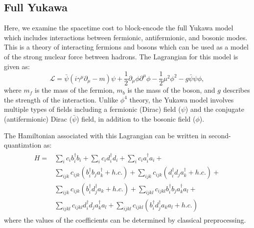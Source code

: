 \subsection{Full Yukawa}
\label{sec:yukawa_results}

Here, we examine the spacetime cost to block-encode the full Yukawa model which includes interactions between fermionic, antifermionic, and bosonic modes.  
This is a theory of interacting fermions and bosons which can be used as a model of the strong nuclear force between hadrons.
The Lagrangian for this model is given as:
\begin{equation}
    \label{eq:yukawa-lagrangian}
    \mathcal{L} = \bar \psi \left(i\gamma^\mu \partial_\mu - m \right)\psi + \frac{1}{2}\partial_\mu \phi \partial^\mu \phi - \frac{1}{2}\mu^2\phi^2 - g\bar \psi \psi \phi,
\end{equation}
where $m_f$ is the mass of the fermion, $m_b$ is the mass of the boson, and $g$ describes the strength of the interaction.
Unlike $\phi^4$ theory, the Yukawa model involves multiple types of fields including a fermionic (Dirac) field ($\psi$) and the conjugate (antifermionic) Dirac ($\bar \psi$) field, in addition to the bosonic field ($\phi$).

The Hamiltonian associated with this Lagrangian can be written in second-quantization as:
\begin{align}
    \begin{split}
        H = &\sum_i c_i b_i^\dagger b_i + \sum_i c_i d_i^\dagger d_i + \sum_i c_i a_i^\dagger a_i + \\
        &\sum_{ijk}c_{ijk}\left(b_i^\dagger b_j a_k^\dagger + h.c. \right) + \sum_{ijk}c_{ijk}\left(d_i^\dagger d_j a_k^\dagger + h.c. \right) + \\
        &\sum_{ijk}c_{ijk}\left(b_i^\dagger d_j^\dagger a_k + h.c. \right) + \sum_{ijkl}c_{ijkl}b_i^\dagger b_j a_k^\dagger a_l + \\
        &\sum_{ijkl}c_{ijkl}d_i^\dagger d_j a_k^\dagger a_l + \sum_{ijkl}c_{ijkl}\left(b_i^\dagger d_j^\dagger a_k a_l + h.c. \right)
    \end{split}
\end{align}
where the values of the coefficients can be determined by classical preprocessing.

